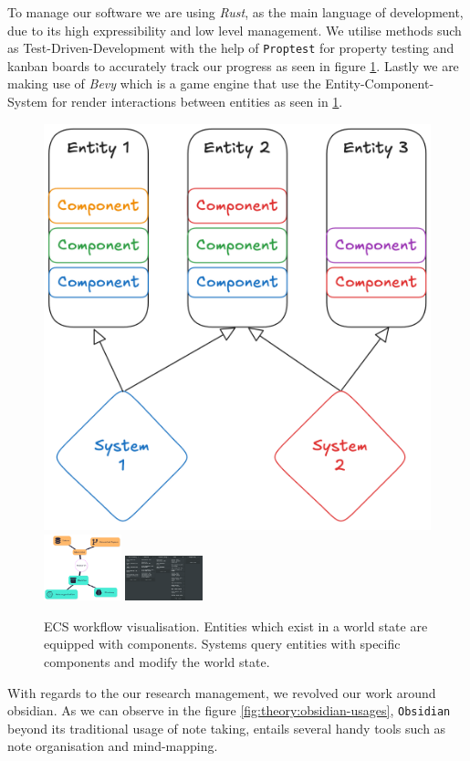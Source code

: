 To manage our software we are using \textit{Rust},
as the main language of development, due to its high expressibility and low level management.
We utilise methods such as Test-Driven-Development with the help of \texttt{Proptest}
for property testing and kanban boards to accurately track our progress as seen
in figure \ref{fig:soft:ecs-workflow}. Lastly we are making use of 
\textit{Bevy} which is a game engine that use the Entity-Component-System
for render interactions between entities as seen in \ref{fig:soft:ecs-workflow}.


\begin{figure}[h!]
    \centering
    \includegraphics[width=0.2\linewidth]{assets/ECS-visualisatoin.png}
    \includegraphics[width=0.2\textwidth]{assets/research-visualisation.png}
    \includegraphics[width=0.2\textwidth]{assets/kanban-board.png}
    \caption{ECS workflow visualisation. Entities which exist in a world state are equipped with components.
    Systems query entities with specific components and modify the world state.}
    \label{fig:soft:ecs-workflow}
\end{figure}

With regards to the our research management, we revolved our work around obsidian.
As we can observe in the figure \ref{fig:theory:obsidian-usages}, 
\texttt{Obsidian} beyond its traditional usage of note taking, entails several handy tools such as note organisation and mind-mapping.



